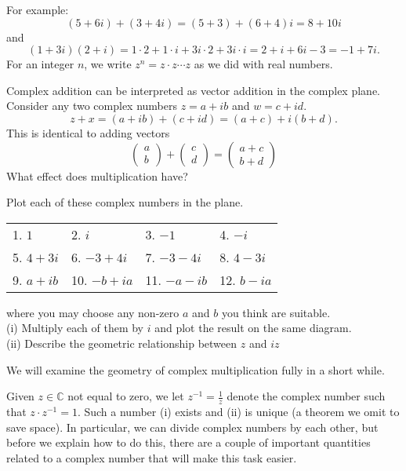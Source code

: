 \documentclass[11pt,dvipsnames]{book}
\numberwithin{equation}{section} %
\numberwithin{figure}{section} %
\numberwithin{table}{section} %
\begin{document}
For example:
\[
(5+6i) + (3+4i)=(5+3)+(6+4)i= 8+10i\]
and
\[
(1+3i)(2+i)=1\cdot 2 + 1\cdot i + 3i\cdot 2 + 3i\cdot i = 2+i+6i-3=-1+7i.
\]
For an integer $n$, we write  $z^{n}=z\cdot z\cdots z$ as we did with real numbers. 

Complex addition can be interpreted as vector addition in the complex plane.
Consider any two complex numbers $z=a+i b$ and $w=c+i d$.
\[ z+x=(a+ib)+(c+id)=(a+c)+i(b+d).\]
This is identical to adding vectors
\[ \begin{pmatrix} a \\ b \end{pmatrix} + \begin{pmatrix} c \\ d \end{pmatrix}
= \begin{pmatrix} a+c \\ b+d \end{pmatrix} \]
What effect does multiplication have?

\begin{example}
Plot each of these complex numbers in the plane.
\begin{center}
\begin{tabular}{llll}
1. $1$    & 2. $i$     & 3. $-1$    & 4.  $-i$ \\
5. $4+3i$ & 6. $-3+4i$ & 7. $-3-4i$ & 8. $4-3i$\\
9. $a+ib$ & 10. $-b+ia$ & 11. $-a-ib$ & 12. $b-ia$
\end{tabular}
\end{center}
where you may choose any non-zero $a$ and $b$ you think are suitable.\\
(i) Multiply each of them by $i$ and plot the result on the same diagram.\\
(ii) Describe the geometric relationship between $z$ and $iz$
\end{example}
We will examine the geometry of complex multiplication fully in a short while.

Given $z\in\mathbb{C}$ not equal to zero, we let $z^{-1}=\frac{1}{z}$ denote the complex number such that $z\cdot z^{-1}=1$. Such a number (i) exists and (ii) is unique (a theorem we omit to save space).
In particular, we can divide complex numbers by each other, but before we explain how to do this, there are a couple of important quantities related to a complex number that will make this task easier. 

\end{document}
